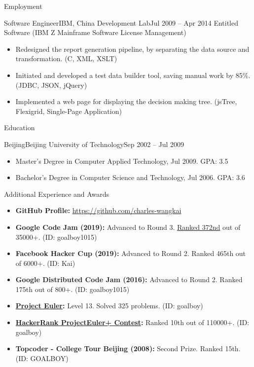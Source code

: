 \documentclass[]{mcdowellcv}
\begin{document}
\begin{cvsection}{Employment}
		\begin{cvsubsection}{Software Engineer}{IBM, China Development Lab}{Jul 2009 – Apr 2014}
			Entitled Software (IBM Z Mainframe Software License Management)
			\begin{itemize}
				\item Redesigned the report generation pipeline, by separating the data source and transformation. (C, XML, XSLT)
				\item Initiated and developed a test data builder tool, saving manual work by 85\%. (JDBC, JSON, jQuery)
				\item Implemented a web page for displaying the decision making tree. (jsTree, Flexigrid, Single-Page Application)
			\end{itemize}
		\end{cvsubsection}
	\end{cvsection}
	
	\begin{cvsection}{Education}
		\begin{cvsubsection}{Beijing}{Beijing University of Technology}{Sep 2002 – Jul 2009}
			\begin{itemize}
				\item Master's Degree in Computer Applied Technology, Jul 2009. GPA: 3.5
				\item Bachelor's Degree in Computer Science and Technology, Jul 2006. GPA: 3.6
			\end{itemize}
		\end{cvsubsection}
	\end{cvsection}
	
	\begin{cvsection}{Additional Experience and Awards}
		\begin{cvsubsection}{}{}{}
			\begin{itemize}
				\item \textbf{GitHub Profile:} \url{https://github.com/charles-wangkai}
				\item \textbf{Google Code Jam (2019):} Advanced to Round 3. {\href{http://charles-wangkai.github.io/certificates/certificate_google_code_jam_2019.pdf}{Ranked 372nd}} out of 35000+. (ID: goalboy1015)
				\item \textbf{Facebook Hacker Cup (2019):} Advanced to Round 2. Ranked 465th out of 6000+. (ID: Kai)
				\item \textbf{Google Distributed Code Jam (2016):} Advanced to Round 2. Ranked 175th out of 800+. (ID: goalboy1015)
				\item \textbf{\href{https://projecteuler.net}{Project Euler}:} Level 13. Solved 325 problems. (ID: goalboy)
				\item \textbf{\href{https://www.hackerrank.com/projecteuler}{HackerRank ProjectEuler+ Contest}:} Ranked 10th out of 110000+. (ID: goalboy)
				\item \textbf{Topcoder - College Tour Beijing (2008):} Second Prize. Ranked 15th. (ID: GOALBOY)
			\end{itemize}
		\end{cvsubsection}
	\end{cvsection}
	
\end{document}
